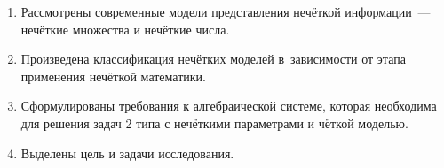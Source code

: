 \begin{enumerate}
  \item Рассмотрены современные модели представления нечёткой информации~--- нечёткие множества и нечёткие числа.
  \item Произведена классификация нечётких моделей в~зависимости от этапа применения нечёткой математики.
  \item Сформулированы требования к алгебраической системе, которая необходима для решения задач 2 типа с нечёткими параметрами и чёткой моделью.
  \item Выделены цель и задачи исследования.
\end{enumerate}
